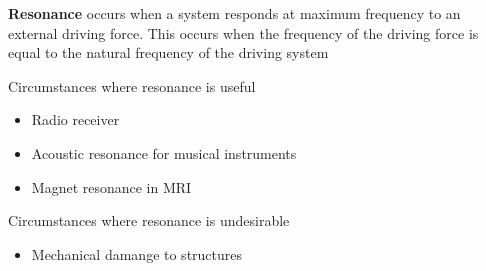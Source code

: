 \documentclass[a4paper, 10pt]{article}
\begin{document}
\begin{framed}
   \textbf{Resonance} occurs when a system responds at maximum frequency to an external driving force. This occurs when the frequency of the driving force is equal to the natural frequency of the driving system
\end{framed}	
Circumstances where resonance is useful
\begin{itemize}
   \item Radio receiver
   \item Acoustic resonance for musical instruments
   \item Magnet resonance in MRI
\end{itemize}	

Circumstances where resonance is undesirable
\begin{itemize}
   \item Mechanical damange to structures
\end{itemize}	
\end{document}
